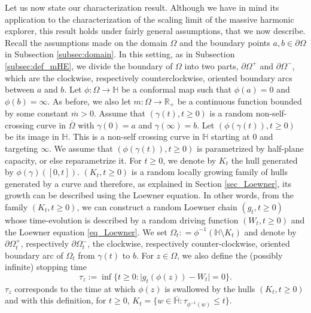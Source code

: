 \documentclass{article}
\newcommand{\HH}{{\mathbb{H}}}
\theoremstyle{definition}
\theoremstyle{remark}
\theoremstyle{remark}
\begin{document}
Let us now state our characterization result. Although we have in mind its application to the characterization of the scaling limit of the massive harmonic explorer, this result holds under fairly general assumptions, that we now describe. Recall the assumptions made on the domain $\Omega$ and the boundary points $a, b \in \partial \Omega$ in Subsection \ref{subsec:domain}. In this setting, as in Subsection \ref{subsec:def_mHE}, we divide the boundary of $\Omega$ into two parts, $\partial \Omega^{+}$ and $\partial \Omega^{-}$, which are the clockwise, respectively counterclockwise, oriented boundary arcs between $a$ and $b$. Let $\phi: \Omega \to \HH$ be a conformal map such that $\phi(a)=0$ and $\phi(b) = \infty$. As before, we also let $m: \Omega \to \mathbb{R}_{+}$ be a continuous function bounded by some constant $\overline{m}>0$. Assume that $(\gamma(t), t \geq 0)$ is a random non-self-crossing curve in $\overline{\Omega}$ with $\gamma(0)=a$ and $\gamma(\infty)=b$. Let $(\phi(\gamma(t)), t \geq 0)$ be its image in $\mathbb{H}$. This is a non-self crossing curve in $\mathbb{H}$ starting at $0$ and targeting $\infty$. We assume that $(\phi(\gamma(t)), t \geq 0)$ is parametrized by half-plane capacity, or else reparametrize it. For $t \geq 0$, we denote by $K_t$ the hull generated by $\phi(\gamma)([0,t])$. $(K_t, t \geq 0)$ is a random locally growing family of hulls generated by a curve and therefore, as explained in Section \ref{sec_Loewner}, its growth can be described using the Loewner equation. In other words, from the family $(K_t, t \geq 0)$, we can construct a random Loewner chain $(g_t, t \geq 0)$ whose time-evolution is described by a random driving function $(W_t, t \geq 0)$ and the Loewner equation \eqref{eq_Loewner}. We set $\Omega_t: = \phi^{-1}(\mathbb{H} \setminus K_t)$ and denote by $\partial \Omega_{t}^{+}$, respectively $\partial \Omega_t^{-}$, the clockwise, respectively counter-clockwise, oriented boundary arc of $\Omega_t$ from $\gamma(t)$ to $b$. For $z \in \Omega$, we also define the (possibly infinite) stopping time
\begin{equation*}
    \tau_z := \inf\{ t \geq 0: \vert g_t(\phi(z)) - W_t \vert = 0\}.
\end{equation*}
$\tau_z$ corresponds to the time at which $\phi(z)$ is swallowed by the hulls $(K_t, t \geq 0)$ and with this definition, for $t \geq 0$, $K_t=\{ w \in \overline{\HH}: \tau_{\phi^{-1}(w)} \leq t\}$.
\end{document}
